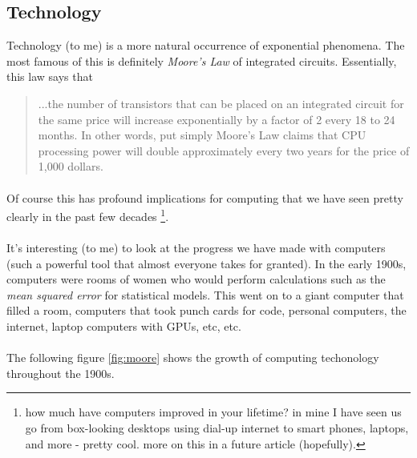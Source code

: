 \documentclass{cup-pan}
\begin{document}
\subsection{Technology}
Technology (to me) is a more natural occurrence of exponential phenomena. The most famous of this is definitely \textit{Moore's Law} of  integrated circuits. Essentially, this law says that 

\begin{quote}
...the number of transistors that can be placed on an integrated circuit for the same price will increase exponentially by a factor of 2 every 18 to 24 months. In other words, put simply Moore's Law claims that CPU processing power will double approximately every two years for the price of 1,000 dollars.
\end{quote}

\paragraph{}
Of course this has profound implications for computing that we have seen pretty clearly in the past few decades \footnote{how much have computers improved in your lifetime? in mine I have seen us go from box-looking desktops using dial-up internet to smart phones, laptops, and more - pretty cool. more on this in a future article (hopefully).}. 

\paragraph{}
It's interesting (to me) to look at the progress we have made with computers (such a powerful tool that almost everyone takes for granted). In the early 1900s, computers were rooms of women who would perform calculations such as the \textit{mean squared error} for statistical models. This went on to a giant computer that filled a room, computers that took punch cards for code, personal computers, the internet, laptop computers with GPUs, etc, etc.

\paragraph{}
The following figure \ref{fig:moore} shows the growth of computing techonology throughout the 1900s.
\end{document}
